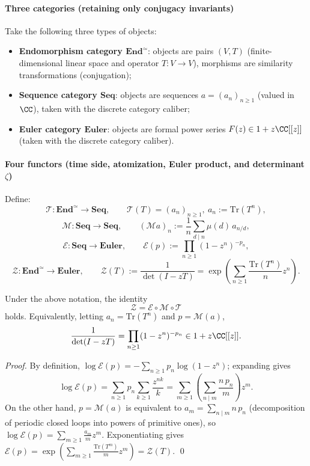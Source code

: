 \paragraph{Three categories (retaining only conjugacy invariants)}
Take the following three types of objects:
\begin{itemize}
  \item \textbf{Endomorphism category $\mathbf{End}^{\simeq}$}: objects are pairs $(V,T)$ (finite-dimensional linear space and operator $T:V\to V$), morphisms are similarity transformations (conjugation);
  \item \textbf{Sequence category $\mathbf{Seq}$}: objects are sequences $a=(a_n)_{n\ge 1}$ (valued in $\CC$), taken with the discrete category caliber;
  \item \textbf{Euler category $\mathbf{Euler}$}: objects are formal power series $F(z)\in 1+z\CC[[z]]$ (taken with the discrete category caliber).
\end{itemize}

\paragraph{Four functors (time side, atomization, Euler product, and determinant $\zeta$)}
Define:
\[
\mathcal{T}:\mathbf{End}^{\simeq}\to\mathbf{Seq},\qquad
\mathcal{T}(T)=(a_n)_{n\ge 1},\ a_n:=\mathrm{Tr}(T^n),
\]
\[
\mathcal{M}:\mathbf{Seq}\to\mathbf{Seq},\qquad
(\mathcal{M}a)_n:=\frac{1}{n}\sum_{d\mid n}\mu(d)\,a_{n/d},
\]
\[
\mathcal{E}:\mathbf{Seq}\to\mathbf{Euler},\qquad
\mathcal{E}(p):=\prod_{n\ge 1}(1-z^n)^{-p_n},
\]
\[
\mathcal{Z}:\mathbf{End}^{\simeq}\to\mathbf{Euler},\qquad
\mathcal{Z}(T):=\frac{1}{\det(I-zT)}=\exp\!\left(\sum_{n\ge 1}\frac{\mathrm{Tr}(T^n)}{n}z^n\right).
\]

\begin{proposition}\label{prop:time-space-commuting-diagram}
Under the above notation, the identity
\[
\boxed{\ \mathcal{Z}=\mathcal{E}\circ\mathcal{M}\circ\mathcal{T}\ }
\]
holds. Equivalently, letting $a_n=\mathrm{Tr}(T^n)$ and $p=\mathcal{M}(a)$,
\[
\frac{1}{\det(I-zT)}=\prod_{n\ge 1}(1-z^n)^{-p_n}\in 1+z\CC[[z]].
\]
\end{proposition}

\begin{proof}
By definition, $\log\mathcal{E}(p)=-\sum_{n\ge 1}p_n\log(1-z^n)$; expanding gives
\[
\log\mathcal{E}(p)=\sum_{n\ge 1}p_n\sum_{k\ge 1}\frac{z^{nk}}{k}
=\sum_{m\ge 1}\left(\sum_{n\mid m}\frac{n\,p_n}{m}\right)z^m.
\]
On the other hand, $p=\mathcal{M}(a)$ is equivalent to $a_m=\sum_{n\mid m}n\,p_n$ (decomposition of periodic closed loops into powers of primitive ones), so
\(
\log\mathcal{E}(p)=\sum_{m\ge 1}\frac{a_m}{m}z^m
\).
Exponentiating gives $\mathcal{E}(p)=\exp(\sum_{m\ge 1}\frac{\mathrm{Tr}(T^m)}{m}z^m)=\mathcal{Z}(T)$. \qed
\end{proof}

